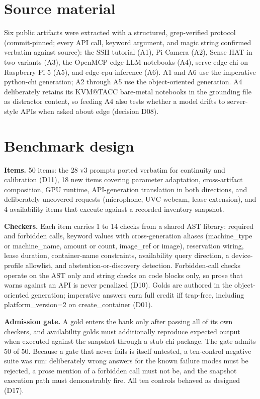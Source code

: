 \documentclass[conference]{IEEEtran}
\begin{document}
\section{Source material}
Six public artifacts were extracted with a structured, grep-verified protocol
(commit-pinned; every API call, keyword argument, and magic string confirmed
verbatim against source): the SSH tutorial (A1), Pi Camera (A2), Sense HAT in
two variants (A3), the OpenMCP edge LLM notebooks (A4), serve-edge-chi on
Raspberry Pi 5 (A5), and edge-cpu-inference (A6). A1 and A6 use the imperative
python-chi generation; A2 through A5 use the object-oriented generation. A4
deliberately retains its KVM@TACC bare-metal notebooks in the grounding file as
distractor content, so feeding A4 also tests whether a model drifts to
server-style APIs when asked about edge (decision D08).

\section{Benchmark design}
\textbf{Items.} 50 items: the 28 v3 prompts ported verbatim for continuity and
calibration (D11), 18 new items covering parameter adaptation, cross-artifact
composition, GPU runtime, API-generation translation in both directions, and
deliberately uncovered requests (microphone, UVC webcam, lease extension), and
4 availability items that execute against a recorded inventory snapshot.

\textbf{Checkers.} Each item carries 1 to 14 checks from a shared AST library:
required and forbidden calls, keyword values with cross-generation aliases
(machine\_type or machine\_name, amount or count, image\_ref or image),
reservation wiring, lease duration, container-name constraints, availability
query direction, a device-profile allowlist, and abstention-or-discovery
detection. Forbidden-call checks operate on the AST only and string checks on
code blocks only, so prose that warns against an API is never penalized (D10).
Golds are authored in the object-oriented generation; imperative answers earn
full credit iff trap-free, including platform\_version=2 on create\_container
(D01).

\textbf{Admission gate.} A gold enters the bank only after passing all of its
own checkers, and availability golds must additionally reproduce expected
output when executed against the snapshot through a stub chi package. The gate
admits 50 of 50. Because a gate that never fails is itself untested, a
ten-control negative suite was run: deliberately wrong answers for the known
failure modes must be rejected, a prose mention of a forbidden call must not
be, and the snapshot execution path must demonstrably fire. All ten controls
behaved as designed (D17).
\end{document}

